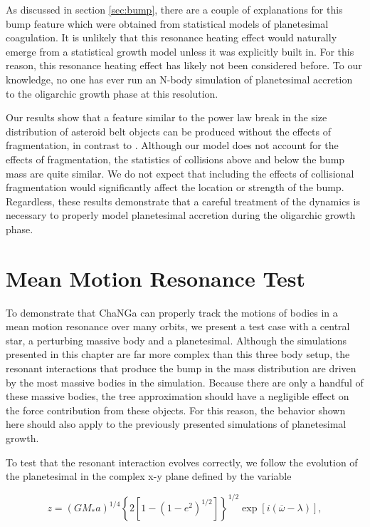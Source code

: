 As discussed in section \ref{sec:bump}, there are a couple of explanations for this bump feature which were obtained from 
statistical models of planetesimal coagulation. It is unlikely that this resonance heating effect would naturally emerge from a 
statistical growth model unless it was explicitly built in. For this reason, this resonance heating effect has likely not been 
considered before. To our knowledge, no one has ever run an N-body simulation of planetesimal accretion to the oligarchic 
growth phase at this resolution.

Our results show that a feature similar to the power law break in the size distribution of asteroid belt objects can be produced 
without the effects of fragmentation, in contrast to \cite{morbidelli09}. Although our model does not account for the effects of 
fragmentation, the statistics of collisions above and below the bump mass are quite similar. We do not expect that including the 
effects of collisional fragmentation would significantly affect the location or strength of the bump. Regardless, these results 
demonstrate that a careful treatment of the dynamics is necessary to properly model planetesimal accretion during the oligarchic 
growth phase.

\section{Mean Motion Resonance Test}

To demonstrate that {\sc ChaNGa} can properly track the motions of bodies in a mean motion resonance over many orbits, we 
present a test case with a central star, a perturbing massive body and a planetesimal. Although the simulations presented in this 
chapter are far more complex than this three body setup, the resonant interactions that produce the bump in the mass distribution 
are driven by the most massive bodies in the simulation. Because there are only a handful of these massive bodies, the tree 
approximation should have a negligible effect on the force contribution from these objects. For this reason, the behavior shown 
here should also apply to the previously presented simulations of planetesimal growth.

To test that the resonant interaction evolves correctly, we follow the evolution of the planetesimal in the complex x-y plane 
defined by the variable \cite{duncan89}

\begin{equation}\label{eq:complex}
    z = \left(G M_{*} a\right)^{1 / 4}\left\{2\left[1-\left(1-e^{2}\right)^{1 / 2}\right]\right\}^{1 / 2} \exp \left[i(\overline{\omega}-\lambda)\right],
\end{equation}

